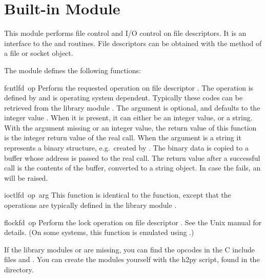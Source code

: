 \section{Built-in Module }

This module performs file control and I/O control on file descriptors.
It is an interface to the  and  \UNIX{} routines.
File descriptors can be obtained with the  method of a
file or socket object.

The module defines the following functions:

\renewcommand{\indexsubitem}{(in module struct)}

\begin{funcdesc}{fcntl}{fd\, op}
  Perform the requested operation on file descriptor .
  The operation is defined by  and is operating system
  dependent.  Typically these codes can be retrieved from the library
  module . The argument  is optional, and
  defaults to the integer value .  When
  it is present, it can either be an integer value, or a string.  With
  the argument missing or an integer value, the return value of this
  function is the integer return value of the real 
  call.  When the argument is a string it represents a binary
  structure, e.g.\ created by . The binary data is
  copied to a buffer whose address is passed to the real 
  call.  The return value after a successful call is the contents of
  the buffer, converted to a string object.  In case the
   fails, an  will be raised.
\end{funcdesc}

\begin{funcdesc}{ioctl}{fd\, op\, arg}
  This function is identical to the  function, except
  that the operations are typically defined in the library module
  .
\end{funcdesc}

\begin{funcdesc}{flock}{fd\, op}
Perform the lock operation  on file descriptor .
See the Unix manual for details.  (On some systems, this function is
emulated using .)
\end{funcdesc}

If the library modules  or  are missing, you
can find the opcodes in the C include files  and
. You can create the modules yourself with the h2py
script, found in the  directory.

